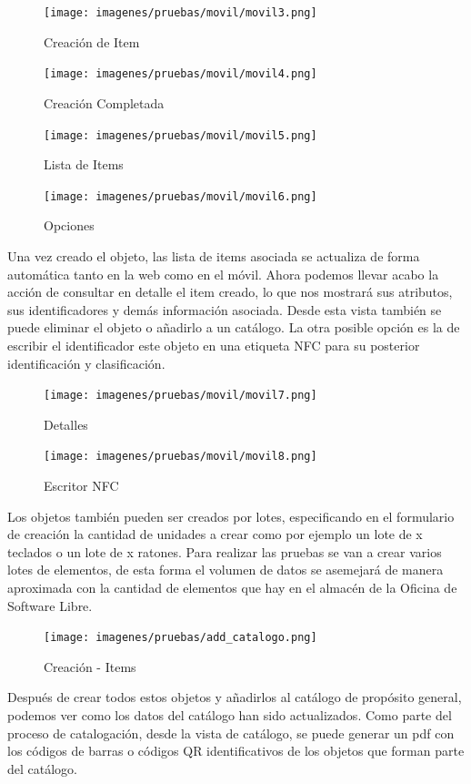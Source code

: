 \documentclass[a4paper,11pt]{book}
\begin{document}
\begin{figure}[H]
  \texttt{[image: imagenes/pruebas/movil/movil3.png]}
  \caption{Creación de Item}
\endminipage\hfill
{}
  \texttt{[image: imagenes/pruebas/movil/movil4.png]}
  \caption{Creación Completada}
\endminipage\hfill
\end{figure}

\begin{figure}[H]
  \texttt{[image: imagenes/pruebas/movil/movil5.png]}
  \caption{Lista de Items}
\endminipage\hfill
{}
  \texttt{[image: imagenes/pruebas/movil/movil6.png]}
  \caption{Opciones}
\endminipage\hfill
\end{figure}

Una vez creado el objeto, las lista de items asociada se actualiza de forma automática tanto en la web como en el móvil. Ahora podemos llevar acabo la acción  de consultar en detalle el item creado, lo que nos mostrará sus atributos, sus identificadores y demás información asociada. Desde esta vista también se puede eliminar el objeto o añadirlo a un catálogo. La  otra posible opción es la de escribir el identificador este objeto en una etiqueta NFC para su posterior identificación y clasificación.

\begin{figure}[H]
  \texttt{[image: imagenes/pruebas/movil/movil7.png]}
  \caption{Detalles}
\endminipage\hfill
{}
  \texttt{[image: imagenes/pruebas/movil/movil8.png]}
  \caption{Escritor NFC}
\endminipage\hfill
\end{figure}

Los objetos también pueden ser creados por lotes, especificando en el formulario de creación la cantidad de unidades a crear como por ejemplo un lote de x teclados o un lote de x ratones. Para realizar las pruebas se van a crear varios lotes de elementos, de esta forma el volumen de datos se asemejará de manera aproximada con la cantidad de elementos que hay en el almacén de la Oficina de Software Libre. 

\begin{figure}[H] 
\centering 
\texttt{[image: imagenes/pruebas/add\_catalogo.png]}
\caption{ Creación - Items}
\end{figure}

Después de crear todos estos objetos y añadirlos al catálogo de propósito general, podemos ver como los datos del catálogo han sido actualizados. Como parte del proceso de catalogación, desde la vista de catálogo, se puede generar un pdf con los códigos de barras o códigos QR identificativos de los objetos que forman parte del catálogo.  
\end{document}
